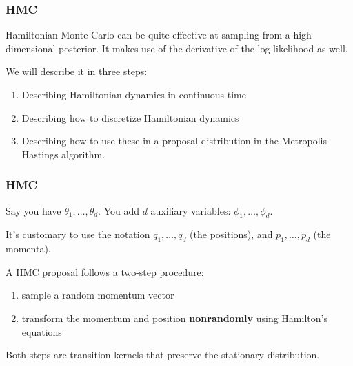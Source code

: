 \documentclass{beamer}
\begin{document}



\begin{frame}
\frametitle{HMC}

Hamiltonian Monte Carlo can be quite effective at sampling from a high-dimensional posterior. It makes use of the derivative of the log-likelihood as well. 
\newline

We will describe it in three steps: 
\begin{enumerate}
\item Describing Hamiltonian dynamics in continuous time
\item Describing how to discretize Hamiltonian dynamics
\item Describing how to use these in a proposal distribution in the Metropolis-Hastings algorithm.
\end{enumerate}


\end{frame}

\begin{frame}
\frametitle{HMC}

Say you have $\theta_1, \ldots, \theta_d$. You add $d$ auxiliary variables: $\phi_1, \ldots, \phi_d$.
\newline

It's customary to use the notation $q_1, \ldots, q_d$ (the positions), and $p_1, \ldots, p_d$ (the momenta).
\newline
\pause

A HMC proposal follows a two-step procedure:
\begin{enumerate}
\item sample a random momentum vector
\item transform the momentum and position {\bf nonrandomly} using Hamilton's equations
\end{enumerate}
Both steps are transition kernels that preserve the stationary distribution.

\end{frame}
\end{document}
